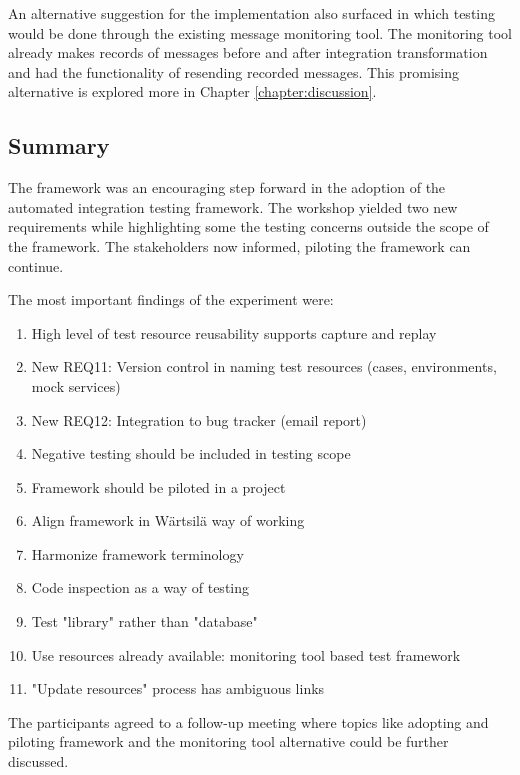 \documentclass[12pt,a4paper,oneside,pdftex]{report}
\begin{document}
{An alternative suggestion for the implementation also surfaced in which testing would be done through the existing message monitoring tool. The monitoring tool already makes records of messages before and after integration transformation and had the functionality of resending recorded messages. This promising alternative is explored more in Chapter \ref{chapter:discussion}.

\subsection{Summary}

The framework was an encouraging step forward in the adoption of the automated integration testing framework. The workshop yielded two new requirements while highlighting some the testing concerns outside the scope of the framework. The stakeholders now informed, piloting the framework can continue.

The most important findings of the experiment were:
\begin{enumerate}

\item High level of test resource reusability supports capture and replay
\item New REQ11: Version control in naming test resources (cases, environments, mock services)
\item New REQ12: Integration to bug tracker (email report)
\item Negative testing should be included in testing scope
\item Framework should be piloted in a project
\item Align framework in Wärtsilä way of working
\item Harmonize framework terminology
\item Code inspection as a way of testing
\item Test "library" rather than "database"
\item Use resources already available: monitoring tool based test framework
\item "Update resources" process has ambiguous links
\end{enumerate}

The participants agreed to a follow-up meeting where topics like adopting and piloting framework and the monitoring tool alternative could be further discussed.

}
\end{document}
